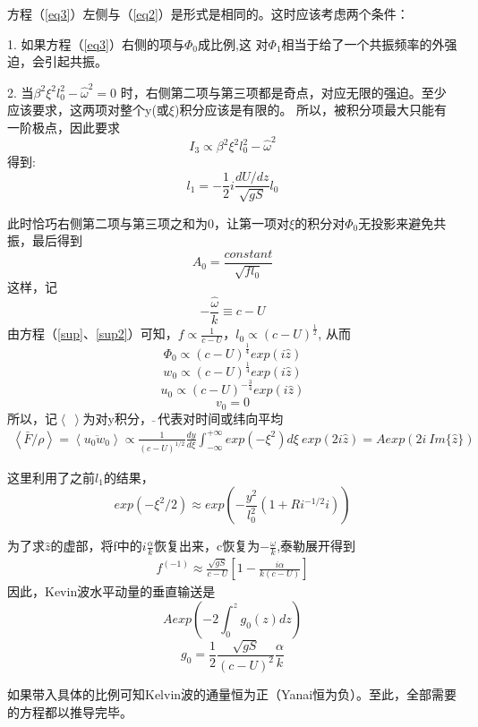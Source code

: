 \documentclass[UTF8]{ctexart}
\begin{document}
	方程（\ref{eq3}）左侧与（\ref{eq2}）是形式是相同的。这时应该考虑两个条件：
	
	1. 如果方程（\ref{eq3}）右侧的项与$\Phi_0$成比例,这
	对$\Phi_1$相当于给了一个共振频率的外强迫，会引起共振。
	
	2. 当$\beta^2\xi^2l_0^2-{\widehat{\omega}}^2=0$
	时，右侧第二项与第三项都是奇点，对应无限的强迫。至少应该要求，这两项对整个y(或$\xi$)积分应该是有限的。
	所以，被积分项最大只能有一阶极点，因此要求
	\[I_3\propto\beta^2\xi^2l_0^2-{\widehat{\omega}}^2\]
	得到:
	\[l_1=-\frac{1}{2}i\frac{dU/dz}{\sqrt{gS}}l_0\]
	
	此时恰巧右侧第二项与第三项之和为0，让第一项对$\xi$的积分对$\Phi_0$无投影来避免共振，最后得到
	\[A_0=\frac{constant}{\sqrt{fl_0}}\]
	这样，记
	\[-\frac{\widehat{\omega}}{k}\equiv c-U\]
	由方程（\ref{sup}、\ref{sup2}）可知，$f\propto\frac{1}{c-U}$，$l_0\propto(c-U)^{\frac{1}{2}}$,
	从而
	\[\Phi_0\propto(c-U)^{\frac{1}{4}}exp(i\widehat{z})\]
	\[w_0\propto(c-U)^{\frac{1}{4}}exp(i\widehat{z})\]
	\[u_0\propto(c-U)^{-\frac{3}{4}}exp(i\widehat{z})\]
	\[v_0=0\]
	所以，记$\left\langle\ \right\rangle$为对y积分，$\bar{\ }\ $代表对时间或纬向平均
	\begin{align}\label{flux}
	\left\langle\bar{F}/\rho\right\rangle=\left\langle{\overline{u_0w_0}}\right\rangle\propto
	\frac{1}{(c-U)^{1/2}}\frac{dy}{d\xi}\int_{-\infty}^{+\infty}exp(-\xi^2)d\xi\ exp(2i\widehat{z})
	=Aexp(2i\ Im\{\widehat{z}\})
	\end{align}
	
	这里利用了之前$l_1$的结果，
	\[exp(-\xi^2/2)\approx exp(-\frac{y^2}{l_0^2}(1+Ri^{-1/2}i))\]
	
	为了求$\widehat{z}$的虚部，将f中的$i\frac{\alpha}{k}$恢复出来，c恢复为$-\frac{\omega}{k}$,泰勒展开得到
	\begin{align}\label{f}
	f^{(-1)}\approx\frac{\sqrt{gS}}{c-U}[1-\frac{i\alpha}{k(c-U)}]
	\end{align}
	因此，Kevin波水平动量的垂直输送是
	\[Aexp(-2\int_{0}^{z}g_0(z)dz)\]
	\[ g_0=\frac{1}{2}\frac{\sqrt{gS}}{(c-U)^2}\frac{\alpha}{k}
	\]
	
	如果带入具体的比例可知Kelvin波的通量恒为正（Yanai恒为负）。至此，全部需要的方程都以推导完毕。
\end{document}
